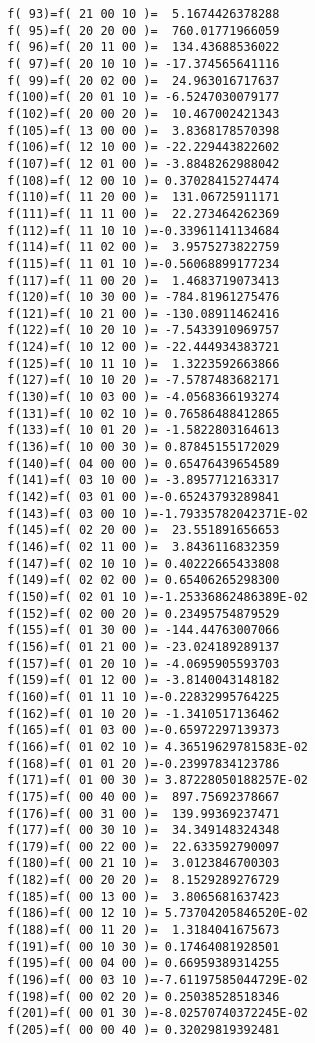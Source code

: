 \begin{footnotesize}
\begin{verbatim}
  f( 93)=f( 21 00 10 )=  5.1674426378288
  f( 95)=f( 20 20 00 )=  760.01771966059
  f( 96)=f( 20 11 00 )=  134.43688536022
  f( 97)=f( 20 10 10 )= -17.374565641116
  f( 99)=f( 20 02 00 )=  24.963016717637
  f(100)=f( 20 01 10 )= -6.5247030079177
  f(102)=f( 20 00 20 )=  10.467002421343
  f(105)=f( 13 00 00 )=  3.8368178570398
  f(106)=f( 12 10 00 )= -22.229443822602
  f(107)=f( 12 01 00 )= -3.8848262988042
  f(108)=f( 12 00 10 )= 0.37028415274474
  f(110)=f( 11 20 00 )=  131.06725911171
  f(111)=f( 11 11 00 )=  22.273464262369
  f(112)=f( 11 10 10 )=-0.33961141134684
  f(114)=f( 11 02 00 )=  3.9575273822759
  f(115)=f( 11 01 10 )=-0.56068899177234
  f(117)=f( 11 00 20 )=  1.4683719073413
  f(120)=f( 10 30 00 )= -784.81961275476
  f(121)=f( 10 21 00 )= -130.08911462416
  f(122)=f( 10 20 10 )= -7.5433910969757
  f(124)=f( 10 12 00 )= -22.444934383721
  f(125)=f( 10 11 10 )=  1.3223592663866
  f(127)=f( 10 10 20 )= -7.5787483682171
  f(130)=f( 10 03 00 )= -4.0568366193274
  f(131)=f( 10 02 10 )= 0.76586488412865
  f(133)=f( 10 01 20 )= -1.5822803164613
  f(136)=f( 10 00 30 )= 0.87845155172029
  f(140)=f( 04 00 00 )= 0.65476439654589
  f(141)=f( 03 10 00 )= -3.8957712163317
  f(142)=f( 03 01 00 )=-0.65243793289841
  f(143)=f( 03 00 10 )=-1.79335782042371E-02
  f(145)=f( 02 20 00 )=  23.551891656653
  f(146)=f( 02 11 00 )=  3.8436116832359
  f(147)=f( 02 10 10 )= 0.40222665433808
  f(149)=f( 02 02 00 )= 0.65406265298300
  f(150)=f( 02 01 10 )=-1.25336862486389E-02
  f(152)=f( 02 00 20 )= 0.23495754879529
  f(155)=f( 01 30 00 )= -144.44763007066
  f(156)=f( 01 21 00 )= -23.024189289137
  f(157)=f( 01 20 10 )= -4.0695905593703
  f(159)=f( 01 12 00 )= -3.8140043148182
  f(160)=f( 01 11 10 )=-0.22832995764225
  f(162)=f( 01 10 20 )= -1.3410517136462
  f(165)=f( 01 03 00 )=-0.65972297139373
  f(166)=f( 01 02 10 )= 4.36519629781583E-02
  f(168)=f( 01 01 20 )=-0.23997834123786
  f(171)=f( 01 00 30 )= 3.87228050188257E-02
  f(175)=f( 00 40 00 )=  897.75692378667
  f(176)=f( 00 31 00 )=  139.99369237471
  f(177)=f( 00 30 10 )=  34.349148324348
  f(179)=f( 00 22 00 )=  22.633592790097
  f(180)=f( 00 21 10 )=  3.0123846700303
  f(182)=f( 00 20 20 )=  8.1529289276729
  f(185)=f( 00 13 00 )=  3.8065681637423
  f(186)=f( 00 12 10 )= 5.73704205846520E-02
  f(188)=f( 00 11 20 )=  1.3184041675673
  f(191)=f( 00 10 30 )= 0.17464081928501
  f(195)=f( 00 04 00 )= 0.66959389314255
  f(196)=f( 00 03 10 )=-7.61197585044729E-02
  f(198)=f( 00 02 20 )= 0.25038528518346
  f(201)=f( 00 01 30 )=-8.02570740372245E-02
  f(205)=f( 00 00 40 )= 0.32029819392481


\end{verbatim}
\end{footnotesize}
